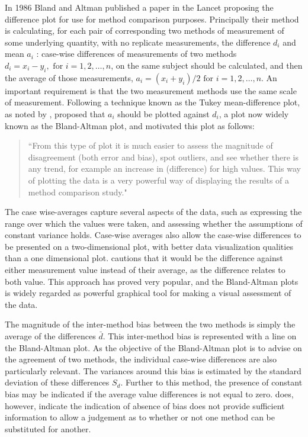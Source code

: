 \documentclass[12pt, a4paper]{report}
\theoremstyle{plain}
\theoremstyle{definition}
\theoremstyle{remark}
\begin{document}
	
In 1986 Bland and Altman published a paper in the Lancet proposing the difference plot for use for method comparison purposes. Principally their method is calculating, for each pair of corresponding two methods of measurement of some underlying quantity, with no replicate measurements, the difference $d_i$ and mean $a_i$ : case-wise differences of measurements of two methods $d_{i} =
x_{i}-y_{i}, \mbox{ for }i=1,2,\dots,n$, on the same subject
should be calculated, and then the average of those measurements, 
$a_{i} = (x_{i} + y_{i})/2 \mbox{ for }i=1,2,\dots, n$. An important requirement is that the two measurement methods use the same scale of measurement. Following a technique known as the Tukey mean-difference plot, as noted by \citet{kozak2014including}, \citet{BA83} proposed that $a_i$ should be plotted against $d_i$, a plot now widely known as the Bland-Altman plot, and motivated this plot as follows:
	\begin{quote}
		``From this type of plot it is much easier to assess the magnitude
		of disagreement (both error and bias), spot outliers, and see
		whether there is any trend, for example an increase in (difference) for high values. This way of plotting the data is a very powerful way of displaying the results of a method comparison study."
	\end{quote}
	
	The case wise-averages capture several aspects of the data, such as expressing the range over which the values were taken, and assessing whether the assumptions of constant variance holds. Case-wise averages also allow the case-wise differences to be presented on a two-dimensional plot, with better data visualization qualities than a one dimensional plot. \citet{BA86}
	cautions that it would be the difference against either measurement value instead of their average, as the difference relates to both value. This approach has proved very popular, and the Bland-Altman plots is widely regarded as powerful graphical tool for making a visual assessment of the data.
	
	The magnitude of the inter-method bias between the two methods is simply the average of the differences $\bar{d}$. This inter-method bias is represented with a line on the Bland-Altman plot. As the objective of the Bland-Altman plot is to advise on the agreement of two methods, the individual case-wise differences are also particularly relevant. The variances around this bias is estimated by the standard deviation of these differences $S_{d}$. Further to this method, the presence of constant bias may be
	indicated if the average value differences is not equal to zero. \citet{BA86} does, however, indicate the indication of absence of bias does not provide sufficient information to allow a	judgement as to whether or not one method can be substituted for
	another.
	
\end{document}
